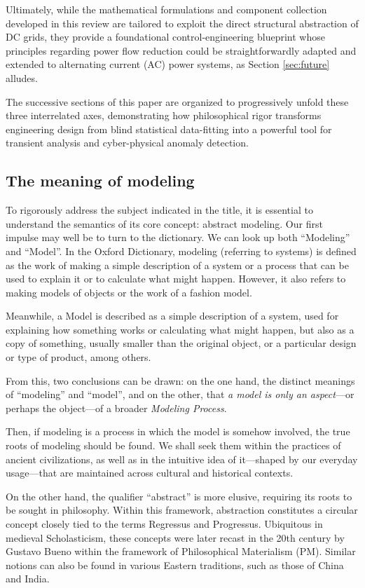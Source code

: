 \documentclass[11pt, a4paper]{article}
\begin{document}
Ultimately, while the mathematical formulations and component collection developed in this review are tailored to exploit the direct structural abstraction of DC grids, they provide a foundational control-engineering blueprint whose principles regarding power flow reduction could be straightforwardly adapted and extended to alternating current (AC) power systems, as Section \ref{sec:future} alludes.

The successive sections of this paper are organized to progressively unfold these three interrelated axes, demonstrating how philosophical rigor transforms engineering design from blind statistical data-fitting into a powerful tool for transient analysis and cyber-physical anomaly detection.




\subsection*{The meaning of modeling} \label{sec:meaning}

To rigorously address the subject indicated in the title, it is essential to understand the semantics of its core concept: abstract modeling. Our first impulse may well be to turn to the dictionary. We can look up both ``Modeling'' and ``Model''. In the Oxford Dictionary, modeling (referring to systems) is defined as the work of making a simple description of a system or a process that can be used to explain it or to calculate what might happen. However, it also refers to making models of objects or the work of a fashion model.

Meanwhile, a Model is described as a simple description of a system, used for explaining how something works or calculating what might happen, but also as a copy of something, usually smaller than the original object, or a particular design or type of product, among others.

From this, two conclusions can be drawn: on the one hand, the distinct meanings of ``modeling'' and ``model'', and on the other, that \textit{a model is only an aspect}—or perhaps the object—of a broader \textit{Modeling Process}.

Then, if modeling is a process in which the model is somehow involved, the true roots of modeling should be found. We shall seek them within the practices of ancient civilizations, as well as in the intuitive idea of it—shaped by our everyday usage—that are maintained across cultural and historical contexts.

On the other hand, the qualifier ``abstract'' is more elusive, requiring its roots to be sought in philosophy. Within this framework, abstraction constitutes a circular concept closely tied to the terms Regressus and Progressus. Ubiquitous in medieval Scholasticism, these concepts were later recast in the 20th century by Gustavo Bueno within the framework of Philosophical Materialism (PM). Similar notions can also be found in various Eastern traditions, such as those of China and India.
\end{document}
